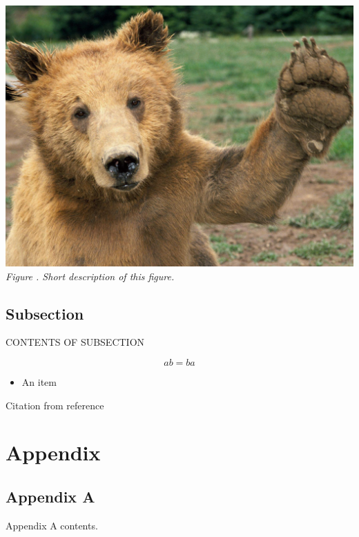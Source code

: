 \documentclass[11pt]{article}
\newcounter{cter}
\newcommand{\ccounter}{
	\thecter.
	\stepcounter{cter}
}
\begin{document}
		\begin{center}	%
			\includegraphics[scale=0.1]{example_pic}\\ %
			\textit{Figure\ccounter Short description of this figure.}
		\end{center}
		
	\subsection{Subsection}
	
	CONTENTS OF SUBSECTION
	
	\begin{equation}
		ab = ba	%
	\end{equation}
	
	\begin{itemize}
		\item An item %
	\end{itemize}
	
	Citation from reference \autocite{glad-06}
		
	\pagebreak
		
	\setcounter{secnumdepth}{0} %
	
	\printbibliography %
	
	\pagebreak
	
	\section{Appendix}
	\subsection{Appendix A} %
	
	Appendix A contents.
\end{document}
